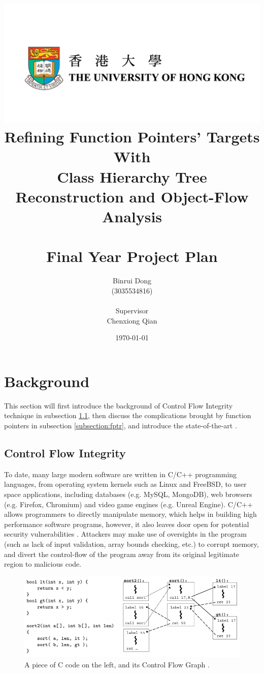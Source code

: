 \documentclass[12pt]{article}
\title{\includegraphics[keepaspectratio,width=0.5\paperwidth]{hku.png} \\ Refining Function Pointers’ Targets With\\ Class Hierarchy Tree Reconstruction and Object-Flow Analysis\\ \  \\Final Year Project Plan}
\author{Binrui Dong\\ (3035534816)\\ \ \\ Supervisor\\ Chenxiong Qian}
\date{\today}
\begin{document}
\maketitle

\newpage

\tableofcontents

\newpage


\section{Background}

This section will first introduce the background of Control Flow Integrity technique in subsection \ref{subsection:cfi}, then discuss the complications brought by function pointers in subsection \ref{subsection:fptr}, and introduce the state-of-the-art .

\subsection{Control Flow Integrity}
\label{subsection:cfi}

To date, many large modern software are written in C/C++ programming languages, from operating system kernels such as Linux and FreeBSD, to user space applications, including databases (e.g. MySQL, MongoDB), web browsers (e.g. Firefox, Chromium) and video game engines (e.g. Unreal Engine). C/C++ allows programmers to directly manipulate memory, which helps in building high performance software programs, however, it also leaves door open for potential security vulnerabilities \cite{BurowNathan2017CIPS}. Attackers may make use of oversights in the program (such as lack of input validation, array bounds checking, etc.) to corrupt memory, and divert the control-flow of the program away from its original legitimate region to malicious code.

\begin{figure}[b]
    \centering
    \includegraphics[keepaspectratio,width=0.55\paperwidth]{cfg.png}
    \caption{A piece of C code on the left, and its Control Flow Graph \cite{cfi2005}.}
    \label{fig:cfg}
\end{figure}
\end{document}
